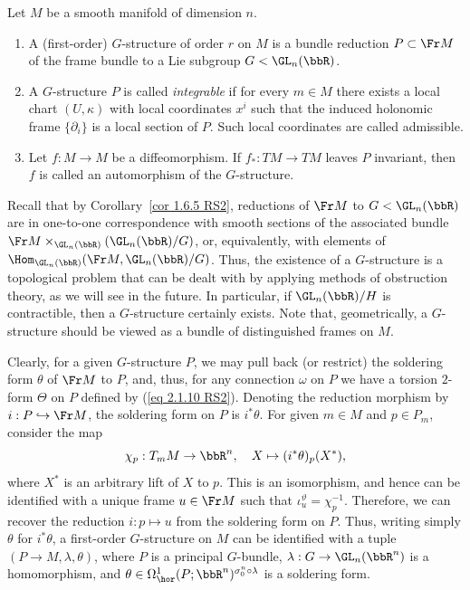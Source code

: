 \begin{defn}
    Let $M$ be a smooth manifold of dimension $n$.
    \begin{enumerate}
        \item A (first-order) $G$-structure of order $r$ on $M$ is a bundle reduction $P\subset \Fr M$ of the frame bundle to a Lie subgroup $G< \GL_n(\bbR)$.
        \item A $G$-structure $P$ is called \emph{integrable} if for every $m\in M$ there exists a local chart $(U,\kappa)$ with local coordinates $x^i$ such that the induced holonomic frame $\{\partial_i\}$ is a local section of $P$. Such local coordinates are called admissible.
        \item Let $f:M\to M$ be a diffeomorphism. If $f_\ast:TM\to TM$ leaves $P$ invariant, then $f$ is called an automorphism of the $G$-structure.
    \end{enumerate}
\end{defn}

Recall that by Corollary~\ref{cor 1.6.5 RS2}, reductions of $\Fr M$ to $G<\GL_n(\bbR)$ are in one-to-one correspondence with smooth sections of the associated bundle $\Fr M\times_{\GL_n(\bbR)}(\GL_n(\bbR)\slash G)$, or, equivalently, with elements of $\Hom_{\GL_n(\bbR)}(\Fr M,\GL_n(\bbR)\slash G)$. Thus, the existence of a $G$-structure is a topological problem that can be dealt with by applying methods of obstruction theory, as we will see in the future. In particular, if $\GL_n(\bbR)\slash H$ is contractible, then a $G$-structure certainly exists. Note that, geometrically, a $G$-structure should be viewed as a bundle of distinguished frames on $M$.

\begin{rem}\label{rem G-structure as soldering}
    Clearly, for a given $G$-structure $P$, we may pull back (or restrict) the soldering form $\theta$ of $\Fr M$ to $P$, and, thus, for any connection $\omega$ on $P$ we have a torsion $2$-form $\Theta$ on $P$ defined by (\ref{eq 2.1.10 RS2}). Denoting the reduction morphism by $i:P\hookrightarrow \Fr M$, the soldering form on $P$ is $i^\ast\theta$. For given $m\in M$ and $p\in P_m$, consider the map 
    \[\chi_p:T_m M\to \bbR^n,\quad X\mapsto (i^\ast\theta)_p(X^\ast),\]
    where $X^\ast$ is an arbitrary lift of $X$ to $p$. This is an isomorphism, and hence can be identified with a unique frame $u\in \Fr M$ such that $\iota_u^\vartheta=\chi_p^{-1}$. Therefore, we can recover the reduction $i:p\mapsto u$ from the soldering form on $P$. Thus, writing simply $\theta$ for $i^\ast\theta$, a first-order $G$-structure on $M$ can be identified with a tuple $(P\to M,\lambda,\theta)$, where $P$ is a principal $G$-bundle, $\lambda:G\to \GL_n(\bbR^n)$ is a homomorphism, and $\theta\in \Omega^1_{\hor}(P;\bbR^n)^{\sigma_0^n\circ\lambda}$ is a soldering form.
\end{rem}

